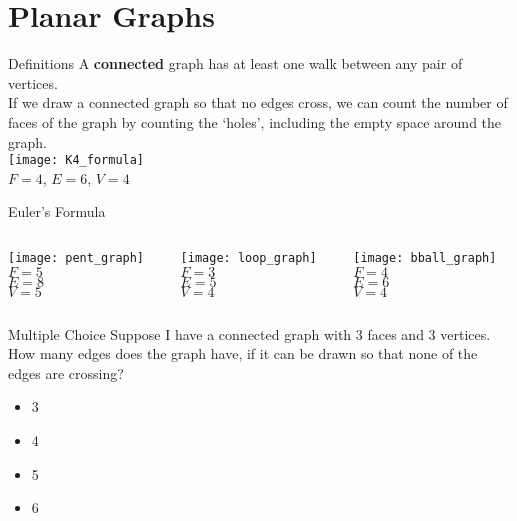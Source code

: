 \documentclass{beamer}
\begin{document}
\section{Planar Graphs}
\begin{frame}{Definitions}
A \textbf{connected} graph has at least one walk between any pair of vertices.\\
If we draw a connected graph so that no edges cross, we can count the number of faces of the graph by counting the `holes', including the empty space around the graph.\vspace*{.2cm}\\
{\centering
\texttt{[image: K4\_formula]}\\
\hfill $F=4$, $E=6$, $V=4$\hfill}
\end{frame}
\begin{frame}{Euler's Formula}
\begin{columns}
\begin{column}{0.35\textwidth}
\centering
\texttt{[image: pent\_graph]}\\
$F=5$\\ $E=8$\\ $V=5$
\end{column}
\begin{column}{0.35\textwidth}
\centering
\texttt{[image: loop\_graph]}\\
$F=3$\\ $E=5$\\$V=4$
\end{column}
\begin{column}{0.35\textwidth}
\centering
\texttt{[image: bball\_graph]}\\
$F=4$\\ $E=6$\\ $V=4$
\end{column}
\end{columns}
\end{frame}
\begin{frame}{Multiple Choice}
Suppose I have a connected graph with 3 faces and 3 vertices. How many edges does the graph have, if it can be drawn so that none of the edges are crossing?
\begin{itemize}
\item 3
\item 4
\item 5
\item 6
\end{itemize}
\end{frame}
\end{document}
